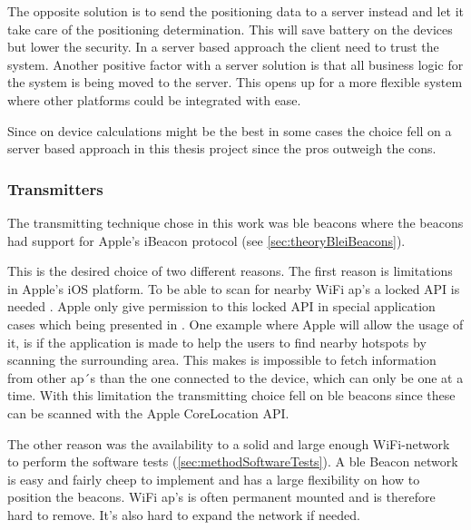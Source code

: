\bigskip

The opposite solution is to send the positioning data to a server instead and let it take care of the positioning determination.
This will save battery on the devices but lower the security. 
In a server based approach the client need to trust the system.
Another positive factor with a server solution is that all business logic for the system is being moved to the server.
This opens up for a more flexible system where other platforms could be integrated with ease.

\bigskip

Since on device calculations might be the best in some cases the choice fell on a server based approach in this thesis project since the pros outweigh the cons.


\subsubsection{Transmitters}\label{sec:methodSoftwareDesignTransmitters}
The transmitting technique chose in this work was \acrshort{ble} beacons where the beacons had support for Apple's iBeacon protocol (see \cref{sec:theoryBleiBeacons}).

\bigskip

This is the desired choice of two different reasons.
The first reason is limitations in Apple's iOS platform.
To be able to scan for nearby WiFi \acrshort{ap}'s a locked API is needed \cite{NEHotspotHelperAppleDeveloper}.
Apple only give permission to this locked API in special application cases which being presented in \cite{TechnicalQA1942IOS}.
One example where Apple will allow the usage of it, is if the application is made to help the users to find nearby hotspots by scanning the surrounding area.
This makes is impossible to fetch information from other \acrshort{ap}´s than the one connected to the device, which can only be one at a time.
With this limitation the transmitting choice fell on \acrshort{ble} beacons since these can be scanned with the Apple CoreLocation API.

\bigskip

The other reason was the availability to a solid and large enough WiFi-network to perform the software tests (\cref{sec:methodSoftwareTests}).
A \acrshort{ble} Beacon network is easy and fairly cheep to implement and has a large flexibility on how to position the beacons.
WiFi \acrshort{ap}'s is often permanent mounted and is therefore hard to remove.
It's also hard to expand the network if needed.
